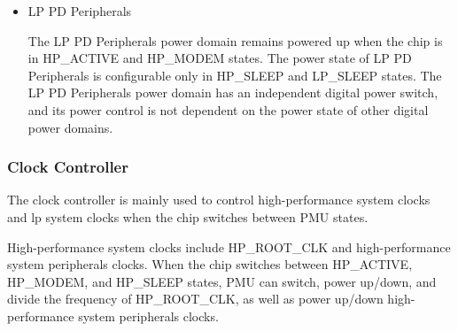 \documentclass[main\_\_EN.tex]{subfiles}
\begin{document}
\begin{itemize}
    \item LP PD Peripherals

    The LP PD Peripherals power domain remains powered up when the chip is in HP\_ACTIVE and HP\_MODEM states. The power state of LP PD Peripherals is configurable only in HP\_SLEEP and LP\_SLEEP states. The LP PD Peripherals power domain has an independent digital power switch, and its power control is not dependent on the power state of other digital power domains.

\end{itemize}

\subsubsection{Clock Controller}

The clock controller is mainly used to control high-performance system clocks and lp system clocks when the chip switches between PMU states.

High-performance system clocks include HP\_ROOT\_CLK and high-performance system peripherals clocks. When the chip switches between HP\_ACTIVE, HP\_MODEM, and HP\_SLEEP states, PMU can switch, power up/down, and divide the frequency of HP\_ROOT\_CLK, as well as power up/down high-performance system peripherals clocks.
\end{document}
